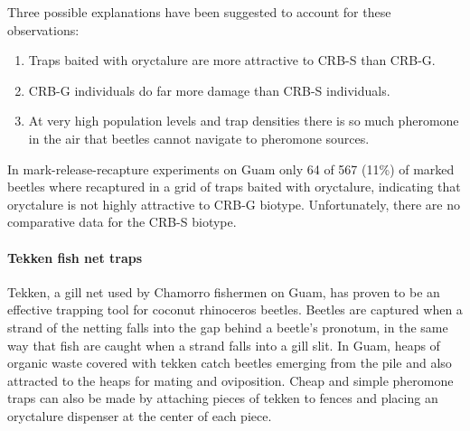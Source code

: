 \documentclass[twocolumn,letterpaper]{scrartcl}
\begin{document}
Three possible explanations have been suggested to account for these observations:
\begin{enumerate}
\item Traps baited with oryctalure are more attractive to CRB-S than CRB-G.
\item CRB-G individuals do far more damage than CRB-S individuals.
\item At very high population levels and trap densities there is so much pheromone in the air that beetles cannot navigate to pheromone sources.
\end{enumerate}

In mark-release-recapture experiments on Guam only 64 of 567 (11\%) of marked beetles where recaptured in a grid of traps baited with oryctalure, indicating that oryctalure is not highly attractive to CRB-G biotype. Unfortunately, there are no comparative data for the CRB-S biotype.  

\paragraph{Tekken fish net traps} Tekken, a gill net used by Chamorro fishermen on Guam, has proven to be an effective trapping tool for coconut rhinoceros beetles. Beetles are captured when a strand of the netting falls into the gap behind a beetle's pronotum, in the same way that fish are caught when a strand falls into a gill slit. In Guam, heaps of organic waste covered with tekken catch beetles emerging from the pile and also attracted to the heaps for mating and oviposition. Cheap and simple pheromone traps can also be made by attaching pieces of tekken to fences and placing an oryctalure dispenser at the center of each piece. 
\end{document}
